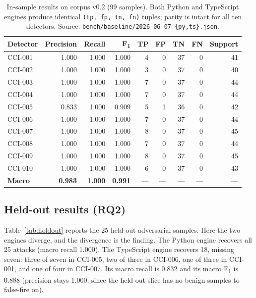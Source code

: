 \begin{table}[t]
\centering
\caption{In-sample results on corpus v0.2 (99 samples). Both Python and
TypeScript engines produce identical \texttt{(tp, fp, tn, fn)} tuples;
parity is intact for all ten detectors. Source:
\texttt{bench/baseline/2026-06-07-\{py,ts\}.json}.}
\label{tab:in-sample}
\begin{tabular}{l r r r r r r r r}
\toprule
Detector & Precision & Recall & F\textsubscript{1} & TP & FP & TN & FN & Support \\
\midrule
CCI-001 & 1.000 & 1.000 & 1.000 & 4 & 0 & 37 & 0 & 41 \\
CCI-002 & 1.000 & 1.000 & 1.000 & 3 & 0 & 37 & 0 & 40 \\
CCI-003 & 1.000 & 1.000 & 1.000 & 7 & 0 & 37 & 0 & 44 \\
CCI-004 & 1.000 & 1.000 & 1.000 & 7 & 0 & 37 & 0 & 44 \\
CCI-005 & 0.833 & 1.000 & 0.909 & 5 & 1 & 36 & 0 & 42 \\
CCI-006 & 1.000 & 1.000 & 1.000 & 7 & 0 & 37 & 0 & 44 \\
CCI-007 & 1.000 & 1.000 & 1.000 & 8 & 0 & 37 & 0 & 45 \\
CCI-008 & 1.000 & 1.000 & 1.000 & 7 & 0 & 37 & 0 & 44 \\
CCI-009 & 1.000 & 1.000 & 1.000 & 8 & 0 & 37 & 0 & 45 \\
CCI-010 & 1.000 & 1.000 & 1.000 & 6 & 0 & 37 & 0 & 43 \\
\midrule
\textbf{Macro} & \textbf{0.983} & \textbf{1.000} & \textbf{0.991} & --- & --- & --- & --- & --- \\
\bottomrule
\end{tabular}
\end{table}

\subsection{Held-out results (RQ2)}
\label{subsec:eval-holdout}

Table~\ref{tab:holdout} reports the 25 held-out adversarial samples.
Here the two engines diverge, and the divergence is the finding. The
Python engine recovers all 25 attacks (macro recall 1.000). The
TypeScript engine recovers 18, missing seven: three of seven in CCI-005,
two of three in CCI-006, one of three in CCI-001, and one of four in
CCI-007. Its macro recall is 0.832 and its macro F\textsubscript{1} is
0.888 (precision stays 1.000, since the held-out slice has no benign
samples to false-fire on).

